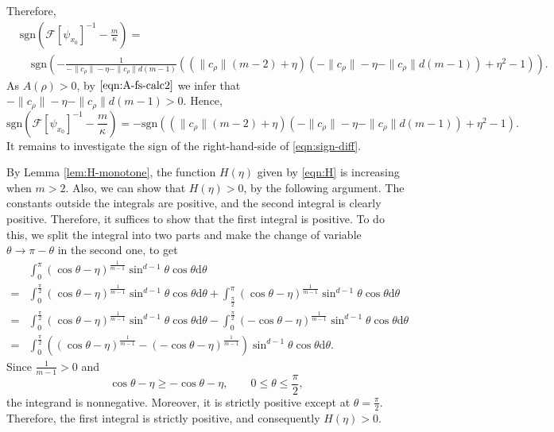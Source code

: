 \documentclass[11pt]{amsart}
\def\d{\mathrm{d}}
\newcommand{\dm}{d} %
\begin{document}
Therefore,
\begin{align*}
&\mathrm{sgn}\left(\mathcal{F}[\psi_{x_0}]^{-1}-\frac{m}{\kappa}\right) = \\
&\quad \mathrm{sgn}\left(-\frac{1}{-\|c_\rho\|-\eta- \|c_\rho\|\dm(m-1)}\left((\|c_\rho\|(m-2)+\eta)(-\|c_\rho\|-\eta-\|c_\rho\|\dm(m-1))+\eta^2-1\right)\right).
\end{align*}
As $A(\rho)>0$, by $\eqref{eqn:A-fs-calc2}$ we infer that $-\|c_\rho\|-\eta-\|c_\rho\|\dm(m-1)>0$. Hence,
\begin{equation}
\label{eqn:sign-diff}
\mathrm{sgn}\left(\mathcal{F}[\psi_{x_0}]^{-1}-\frac{m}{\kappa}\right)=-\mathrm{sgn}\left((\|c_\rho\|(m-2)+\eta)(-\|c_\rho\|-\eta-\|c_\rho\|\dm(m-1))+\eta^2-1\right).
\end{equation}
It remains to investigate the sign of the right-hand-side of \eqref{eqn:sign-diff}.

By Lemma \ref{lem:H-monotone}, the function $H(\eta)$ given by \eqref{eqn:H} is increasing when $m>2$.  Also, we can show that $H(\eta)>0$, by the following argument. The constants outside the integrals are positive, and the second integral is clearly positive. Therefore, it suffices to show that the first integral is positive. To do this, we split the integral into two parts and make the change of variable $\theta\to\pi-\theta$ in the second one, to get
\begin{align*}
&\int_0^\pi (\cos\theta-\eta)^{\frac{1}{m-1}}\sin^{\dm-1}\theta \cos\theta\d\theta\\
=&\int_0^{\frac{\pi}{2}} (\cos\theta-\eta)^{\frac{1}{m-1}}\sin^{\dm-1}\theta \cos\theta\d\theta
+\int_{\frac{\pi}{2}}^\pi (\cos\theta-\eta)^{\frac{1}{m-1}}\sin^{\dm-1}\theta \cos\theta\d\theta\\
=&\int_0^{\frac{\pi}{2}} (\cos\theta-\eta)^{\frac{1}{m-1}}\sin^{\dm-1}\theta \cos\theta\d\theta
-\int_{0}^{\frac{\pi}{2}} (-\cos\theta-\eta)^{\frac{1}{m-1}}\sin^{\dm-1}\theta \cos\theta\d\theta\\
=&\int_0^{\frac{\pi}{2}}\left((\cos\theta-\eta)^{\frac{1}{m-1}}-(-\cos\theta-\eta)^{\frac{1}{m-1}}\right)\sin^{\dm-1}\theta\cos\theta\d\theta.
\end{align*}
Since $\frac{1}{m-1}>0$ and
\[
\cos\theta-\eta\ge -\cos\theta-\eta,
\qquad
0\le\theta\le\frac{\pi}{2},
\]
the integrand is nonnegative. Moreover, it is strictly positive except at $\theta=\frac{\pi}{2}$. Therefore, the first integral is strictly positive, and consequently $H(\eta)>0$.
\end{document}
